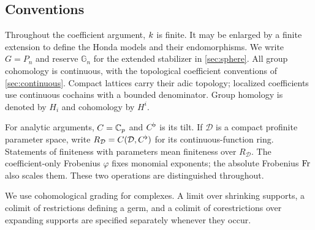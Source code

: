 \subsection{Conventions}

Throughout the coefficient argument, $k$ is finite. It may be
enlarged by a finite extension to define the Honda models and their
endomorphisms. We write $G=P_n$ and reserve $\mathbb G_n$ for the
extended stabilizer in \cref{sec:sphere}. All group cohomology is
continuous, with the topological coefficient conventions of
\cref{sec:continuous}. Compact lattices carry their adic topology;
localized coefficients use continuous cochains with a bounded
denominator. Group homology is denoted by $H_i$ and cohomology by
$H^i$.

For analytic arguments, $C=\mathbb C_p$ and $C^\flat$ is its tilt. If
$\mathcal D$ is a compact profinite parameter space, write
$R_{\mathcal D}=C(\mathcal D,C^\flat)$ for its continuous-function
ring. Statements of finiteness with parameters mean finiteness
over $R_{\mathcal D}$. The coefficient-only Frobenius $\varphi$
fixes monomial exponents; the absolute Frobenius $\operatorname{Fr}$ also scales
them. These two operations are distinguished throughout.

We use cohomological grading for complexes. A limit over shrinking
supports, a colimit of restrictions defining a germ, and a colimit
of corestrictions over expanding supports are specified separately
whenever they occur.
